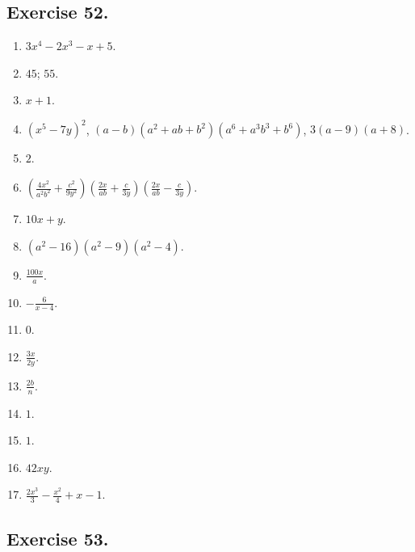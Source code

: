 \documentclass{book}
\begin{document}
\subsection*{Exercise 52.} \begin{enumerate}

\item $3x^4-2x^3-x+5$.

\item $45$; $55$.

\item $x+1$.

\item $(x^5-7y)^2$, $(a-b)(a^2+ab+b^2)(a^6+a^3b^3+b^6)$,
 $3(a-9)(a+8)$.

\item $2$.

\item $\displaystyle
\left(\frac{4x^2}{a^2b^2}+\frac{c^2}{9y^2}\right)
  \left(\frac{2x}{ab}+\frac{c}{3y}\right)
    \left(\frac{2x}{ab}-\frac{c}{3y}\right)$.

\item $10x+y$.

\item $(a^2-16)(a^2-9)(a^2-4)$.

\item $\displaystyle \frac{100x}{a}$.

\item $\displaystyle -\frac{6}{x-4}$.

\item $0$.

\item $\displaystyle \frac{3x}{2y}$.

\item $\displaystyle \frac{2b}{n}$.

\item $1$.

\item $1$.

\setcounter{enumi}{16}

\item $42xy$.

\item $\displaystyle \frac{2x^3}{3} - \frac{x^2}{4} + x - 1$.
\end{enumerate}

\subsection*{Exercise 53.}
\end{document}
